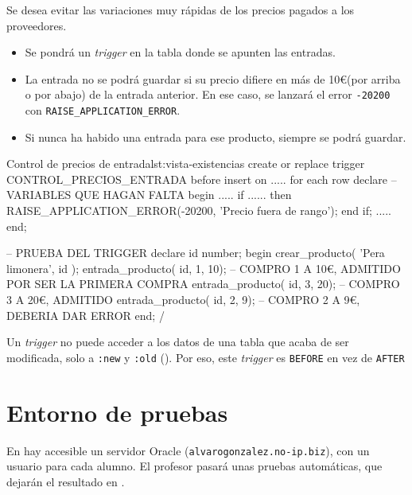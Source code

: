 \begin{homeworkProblem}

  Se desea evitar las variaciones muy rápidas de los precios pagados a los proveedores.
  \begin{itemize}
  \item Se pondrá un \textit{trigger} en la tabla donde se apunten las entradas.
  \item La entrada  no se podrá guardar si su precio difiere en más de 10\euro (por arriba o por abajo) de la entrada anterior. En ese caso, se lanzará el error \texttt{-20200} con \texttt{RAISE\_APPLICATION\_ERROR}.
  \item Si nunca ha habido una entrada para ese producto, siempre se podrá guardar.
  \end{itemize}

\begin{listadosql}{Control de precios de entrada}{lst:vista-existencias}
create or replace trigger CONTROL_PRECIOS_ENTRADA
before insert on .....
for each row 
declare
-- VARIABLES QUE HAGAN FALTA
begin
.....
if ...... then
RAISE_APPLICATION_ERROR(-20200, 'Precio fuera de rango');
end if;
.....
end;

-- PRUEBA DEL TRIGGER
declare
id number;
begin
crear_producto( 'Pera limonera', id );
entrada_producto( id, 1, 10); -- COMPRO 1 A 10€, ADMITIDO POR SER LA PRIMERA COMPRA
entrada_producto( id, 3, 20); -- COMPRO 3 A 20€, ADMITIDO
entrada_producto( id, 2, 9); -- COMPRO 2 A 9€, DEBERIA DAR ERROR
end;
/
\end{listadosql}  

  \begin{Aviso}
    Un \textit{trigger} no puede acceder a los datos de una tabla que acaba de ser modificada, solo a \texttt{:new} y \texttt{:old} (). Por eso, este \textit{trigger} es \texttt{BEFORE} en vez de \texttt{AFTER}
  \end{Aviso}


\end{homeworkProblem}


\section{Entorno de pruebas}
En hay accesible un servidor Oracle (\texttt{alvarogonzalez.no-ip.biz}), con un usuario para cada alumno.
El profesor pasará unas pruebas automáticas, que dejarán el resultado en .

